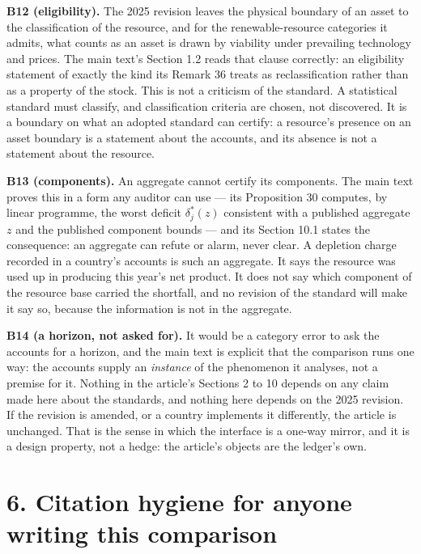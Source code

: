 \documentclass[11pt]{article}
\begin{document}
\textbf{B12 (eligibility).} The 2025 revision leaves the physical boundary of an asset to the classification of the resource, and for the renewable-resource categories it admits, what counts as an asset is drawn by viability under prevailing technology and prices. The main text's Section 1.2 reads that clause correctly: an eligibility statement of exactly the kind its Remark 36 treats as reclassification rather than as a property of the stock. This is not a criticism of the standard. A statistical standard must classify, and classification criteria are chosen, not discovered. It is a boundary on what an adopted standard can certify: a resource's presence on an asset boundary is a statement about the accounts, and its absence is not a statement about the resource.

\textbf{B13 (components).} An aggregate cannot certify its components. The main text proves this in a form any auditor can use --- its Proposition 30 computes, by linear programme, the worst deficit \(\delta_j^{\ast}(z)\) consistent with a published aggregate \(z\) and the published component bounds --- and its Section 10.1 states the consequence: an aggregate can refute or alarm, never clear. A depletion charge recorded in a country's accounts is such an aggregate. It says the resource was used up in producing this year's net product. It does not say which component of the resource base carried the shortfall, and no revision of the standard will make it say so, because the information is not in the aggregate.

\textbf{B14 (a horizon, not asked for).} It would be a category error to ask the accounts for a horizon, and the main text is explicit that the comparison runs one way: the accounts supply an \emph{instance} of the phenomenon it analyses, not a premise for it. Nothing in the article's Sections 2 to 10 depends on any claim made here about the standards, and nothing here depends on the 2025 revision. If the revision is amended, or a country implements it differently, the article is unchanged. That is the sense in which the interface is a one-way mirror, and it is a design property, not a hedge: the article's objects are the ledger's own.

\vspace{0.8em}

\section*{6. Citation hygiene for anyone writing this comparison}\label{6-citation-hygiene-for-anyone-writing-this-comparison}
\end{document}

